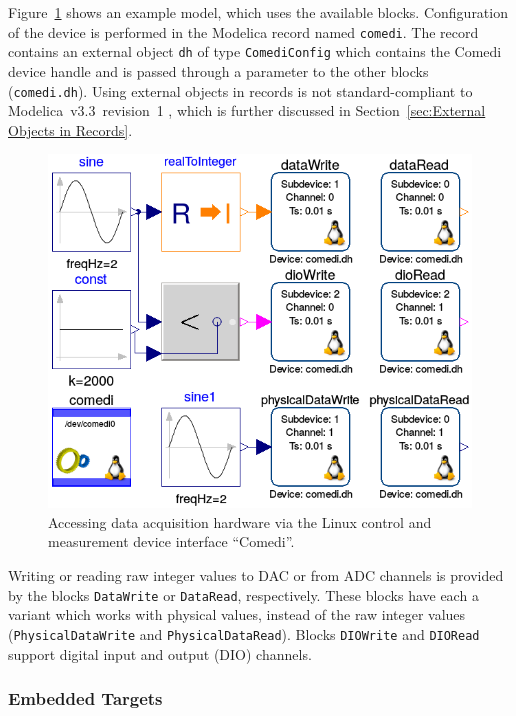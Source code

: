 \documentclass{resources/modelica}
\newcommand{\modelica}[1]{\lstinline[language=modelica]|#1|}
\begin{document}
Figure~\ref{fig:MDDComedi} shows an example model, which uses the available
blocks. Configuration of the device is performed in the Modelica record named
\modelica{comedi}. The record contains an external object \modelica{dh} of type
\modelica{ComediConfig} which contains the Comedi device handle and is passed through
a parameter to the other blocks (\modelica{comedi.dh}). Using external
objects in records is not standard-compliant to Modelica~v3.3~revision~1
\citep{ModelicaAssociation2014}, which is further discussed in
Section~\ref{sec:External Objects in Records}.
\begin{figure}[h]
  \centering
  \includegraphics[width=0.9\columnwidth]{figures/MDDComedi}
  \caption{Accessing data acquisition hardware via the Linux
  control and measurement device interface ``Comedi''.}
  \label{fig:MDDComedi}
\end{figure}

\noindent
Writing or reading raw integer values to DAC or from ADC channels is provided by the
blocks \mbox{\modelica{DataWrite}} or \modelica{DataRead}, respectively. These blocks have
each a variant which works with physical values, instead of the raw integer
values (\modelica{PhysicalDataWrite} and \modelica{PhysicalDataRead}).
Blocks \modelica{DIOWrite} and \modelica{DIORead} support digital input and
output (DIO) channels.

\subsubsection{Embedded Targets}
\label{sec:EmbeddedTargets}
\end{document}

